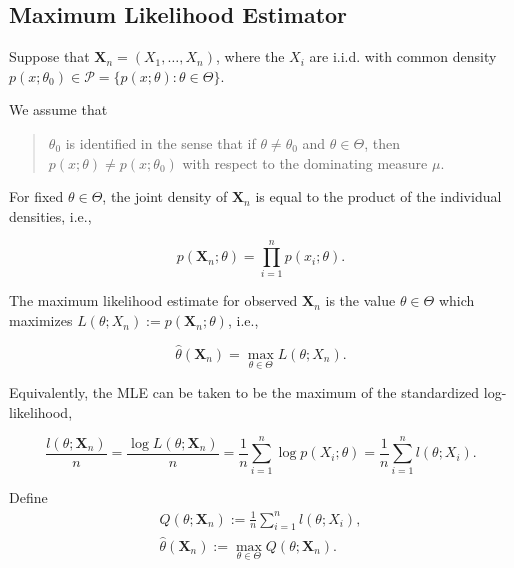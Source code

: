 \subsection{Maximum Likelihood Estimator}

Suppose that $\textbf{X}_{n}=\left(X_{1},\ldots,X_{n}\right)$, where the $X_{i}$ are i.i.d. with common density $p\left(x;\theta_{0}\right)\in\mathcal{P}=\{p(x;\theta):\theta\in\Theta\}$.

We assume that

\begin{quotation}
    $\theta_{0}$ is identified in the sense that if $\theta\neq\theta_{0}$ and $\theta\in\Theta$, then $p(x;\theta)\neq p\left(x;\theta_{0}\right)$ with respect to the dominating measure $\mu$.
\end{quotation}

For fixed $\theta\in\Theta$, the joint density of $\textbf{X}_{n}$ is equal to the product of the individual densities, i.e.,

\begin{equation}
    p\left(\textbf{X}_{n};\theta\right)=\prod_{i=1}^{n} p\left(x_{i};\theta\right).
\end{equation}

The maximum likelihood estimate for observed $\textbf{X}_{n}$ is the value $\theta\in\Theta$ which maximizes $L\left(\theta;X_{n}\right):=p\left(\textbf{X}_{n};\theta\right)$, i.e.,

\begin{equation}
    \hat{\theta}\left(\textbf{X}_{n}\right)=\max_{\theta\in\Theta}L\left(\theta;X_{n}\right).
\end{equation}

Equivalently, the MLE can be taken to be the maximum of the standardized log-likelihood,

\begin{equation}
    \frac{l\left(\theta;\textbf{X}_{n}\right)}{n}=\frac{\log L\left(\theta;\textbf{X}_{n}\right)}{n}=\frac{1}{n}\sum_{i=1}^{n}\log p\left(X_{i};\theta\right)=\frac{1}{n}\sum_{i=1}^{n}l\left(\theta;X_{i}\right).
\end{equation}

Define
\begin{equation}
    \begin{gathered}
        Q\left(\theta;\textbf{X}_{n}\right):=\frac{1}{n}\sum_{i=1}^{n}l\left(\theta;X_{i}\right), \\
        \hat{\theta}\left(\textbf{X}_{n}\right):=\max_{\theta\in\Theta}Q\left(\theta;\textbf{X}_{n}\right). \\
    \end{gathered}
\end{equation}

